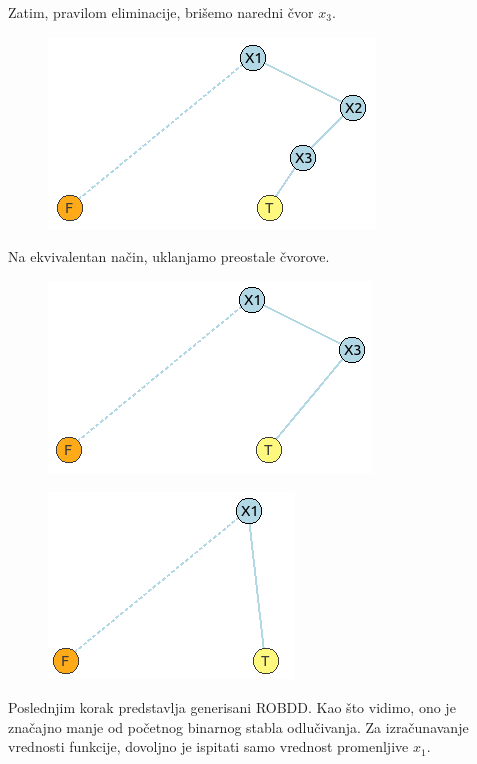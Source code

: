 \begin{exmp}
    Zatim, pravilom eliminacije, bri\v{s}emo naredni \v{c}vor $x_{3}$.

    \begin{figure}[H]
        \centering
        \includegraphics{slike/primer/06.png}
    \end{figure}

    Na ekvivalentan na\v{c}in, uklanjamo preostale \v{c}vorove.

    \begin{figure}[H]
        \centering
        \includegraphics{slike/primer/07.png}
    \end{figure}

    \begin{figure}[H]
        \centering
        \includegraphics{slike/primer/08.png}
    \end{figure}

    Poslednjim korak predstavlja generisani ROBDD. Kao \v{s}to vidimo, ono je zna\v{c}ajno manje od po\v{c}etnog binarnog stabla odlu\v{c}ivanja. Za izra\v{c}unavanje vrednosti funkcije, dovoljno je ispitati samo vrednost promenljive $x_{1}$.
\end{exmp}


